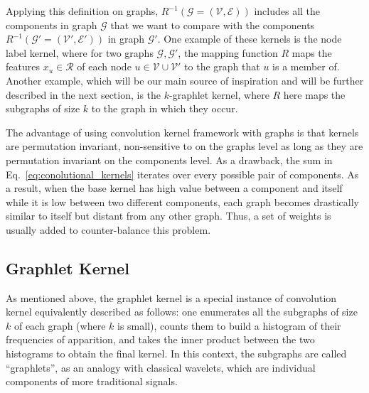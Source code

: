 Applying this definition on graphs, $R^{-1}(\mathcal{G}=(\mathcal{V},\mathcal{E}))$ includes all the components in graph $\mathcal{G}$  that we want to compare with the components $R^{-1}(\mathcal{G'}=(\mathcal{V}',\mathcal{E}'))$ in graph $\mathcal{G'}$. One example of these kernels is the node label kernel, where for two graphs $\mathcal{G}, \mathcal{G'}$, the mapping function $R$ maps the features $x_u\in \mathcal{R}$ of each node $u\in \mathcal{V}\cup \mathcal{V'}$ to the graph that $u$ is a member of. Another example, which will be our main source of inspiration and will be further described in the next section, is the $k$-graphlet kernel, where $R$ here maps the subgraphs of size $k$ to the graph in which they occur.
 
The advantage of using convolution kernel framework with graphs is that kernels are permutation invariant, non-sensitive to  on the graphs level as long as they are permutation invariant on the components level. As a drawback, the sum in Eq.~\ref{eq:conolutional_kernels} iterates over every possible pair of components. As a result, when the base kernel has high value between a component and itself while it is low between two different components, each graph becomes drastically similar to itself but distant from any other graph. Thus, a set of weights is usually added to counter-balance this problem.

\subsection{Graphlet Kernel}
\label{subsection: graphlet kernel}

As mentioned above, the graphlet kernel is a special instance of convolution kernel equivalently described as follows: one enumerates all the subgraphs of size $k$ of each graph (where $k$ is small), counts them to build a histogram of their frequencies of apparition, and takes the inner product between the two histograms to obtain the final kernel. In this context, the subgraphs are called ``graphlets'', as an analogy with classical wavelets, which are individual components of more traditional signals.


